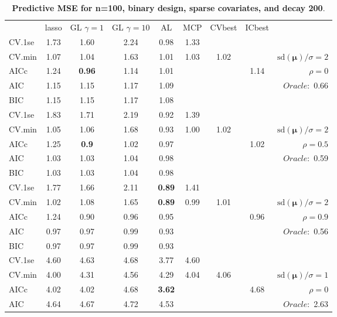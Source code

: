 \begin{table}\vspace{-.5cm}
\caption[l]{ { \bf Predictive MSE for n=100, binary design, 
sparse covariates, and  decay  200}.}
\vspace{-.5cm}
\footnotesize{}
\begin{center}
\begin{tabular}{l*{7}{c}|r}
 & lasso & GL $\gamma=1$ & GL $\gamma=10$ & AL & MCP  & CVbest & ICbest  \\
\cline{1-9}
CV.1se & 1.73 & 1.60 & 2.24 & 0.98 & 1.33 & & & \\
CV.min & 1.07 & 1.04 & 1.63 & 1.01 & 1.03 & 1.02 & & $\mathrm{sd}(\mathbf{\mu})/\sigma=2$ \\
AICc & 1.24 & {\bf 0.96} & 1.14 & 1.01 & & & 1.14 &  $\rho=0$ \\
AIC & 1.15 & 1.15 & 1.17 & 1.09 & & & &  \multirow{2}{*}{$Oracle: $ 0.66} \\
BIC & 1.15 & 1.15 & 1.17 & 1.08 & & & &  \\
 \hline 
CV.1se & 1.83 & 1.71 & 2.19 & 0.92 & 1.39 & & & \\
CV.min & 1.05 & 1.06 & 1.68 & 0.93 & 1.00 & 1.02 & & $\mathrm{sd}(\mathbf{\mu})/\sigma=2$ \\
AICc & 1.25 & {\bf 0.9} & 1.02 & 0.97 & & & 1.02 &  $\rho=0.5$ \\
AIC & 1.03 & 1.03 & 1.04 & 0.98 & & & &  \multirow{2}{*}{$Oracle: $ 0.59} \\
BIC & 1.03 & 1.03 & 1.04 & 0.98 & & & &  \\
 \hline 
CV.1se & 1.77 & 1.66 & 2.11 & {\bf 0.89} & 1.41 & & & \\
CV.min & 1.02 & 1.08 & 1.65 & {\bf 0.89} & 0.99 & 1.01 & & $\mathrm{sd}(\mathbf{\mu})/\sigma=2$ \\
AICc & 1.24 & 0.90 & 0.96 & 0.95 & & & 0.96 &  $\rho=0.9$ \\
AIC & 0.97 & 0.97 & 0.99 & 0.93 & & & &  \multirow{2}{*}{$Oracle: $ 0.56} \\
BIC & 0.97 & 0.97 & 0.99 & 0.93 & & & &  \\
 \hline 
CV.1se & 4.60 & 4.63 & 4.68 & 3.77 & 4.60 & & & \\
CV.min & 4.00 & 4.31 & 4.56 & 4.29 & 4.04 & 4.06 & & $\mathrm{sd}(\mathbf{\mu})/\sigma=1$ \\
AICc & 4.02 & 4.02 & 4.68 & {\bf 3.62} & & & 4.68 &  $\rho=0$ \\
AIC & 4.64 & 4.67 & 4.72 & 4.53 & & & &  \multirow{2}{*}{$Oracle: $ 2.63} \\

\end{tabular}
\end{center}
\end{table}
